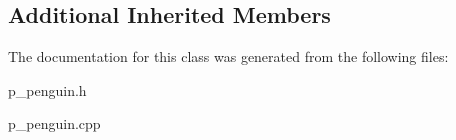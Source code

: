 \subsection*{Additional Inherited Members}


The documentation for this class was generated from the following files\+:\begin{DoxyCompactItemize}
\item 
p\+\_\+penguin.\+h\item 
p\+\_\+penguin.\+cpp\end{DoxyCompactItemize}

